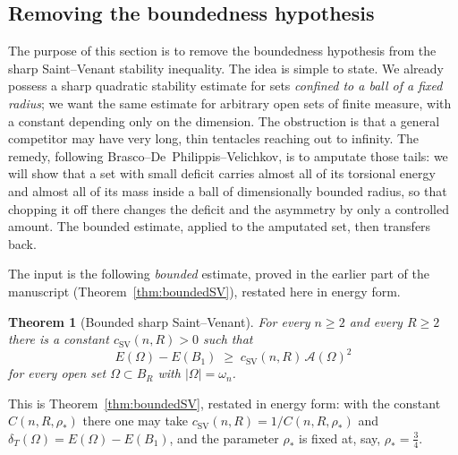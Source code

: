 \documentclass[11pt]{amsart}
\newtheorem{theorem}{Theorem}[section]
\theoremstyle{definition}
\newcommand{\Om}{\Omega}
\newcommand{\Fr}{\mathcal A}
\newcommand{\dT}{\delta_T}
\newcommand{\rstar}{\rho_*}
\newcommand{\abs}[1]{\left|#1\right|}
\begin{document}
\subsection{Removing the boundedness hypothesis}\label{sec:part-bddred}\label{sec:bddred}


The purpose of this section is to remove the boundedness hypothesis from
the sharp Saint--Venant stability inequality. The idea is simple to
state. We already possess a sharp quadratic stability estimate for sets
\emph{confined to a ball of a fixed radius}; we want the same estimate
for arbitrary open sets of finite measure, with a constant depending
only on the dimension. The obstruction is that a general competitor may
have very long, thin tentacles reaching out to infinity. The remedy,
following Brasco--De~Philippis--Velichkov, is to amputate those tails:
we will show that a set with small deficit carries almost all of its
torsional energy and almost all of its mass inside a ball of
dimensionally bounded radius, so that chopping it off there changes the
deficit and the asymmetry by only a controlled amount. The bounded
estimate, applied to the amputated set, then transfers back.

The input is the following \emph{bounded} estimate, proved in the earlier
part of the manuscript (Theorem~\ref{thm:boundedSV}), restated here in
energy form.

\begin{theorem}[Bounded sharp Saint--Venant]\label{thm:SV-bounded}
For every $n\ge2$ and every $R\ge2$ there is a constant
$c_{\mathrm{SV}}(n,R)>0$ such that
\begin{equation}\label{eq:SV-bounded}
   E(\Om)-E(B_1)\;\ge\;c_{\mathrm{SV}}(n,R)\,\Fr(\Om)^2
\end{equation}
for every open set $\Om\subset B_R$ with $\abs{\Om}=\omega_n$.
\end{theorem}

This is Theorem~\ref{thm:boundedSV}, restated in energy form: with the
constant $C(n,R,\rstar)$ there one may take
$c_{\mathrm{SV}}(n,R)=1/C(n,R,\rstar)$ and
$\dT(\Om)=E(\Om)-E(B_1)$, and the parameter $\rstar$ is fixed at, say,
$\rstar=\tfrac34$.
\end{document}
